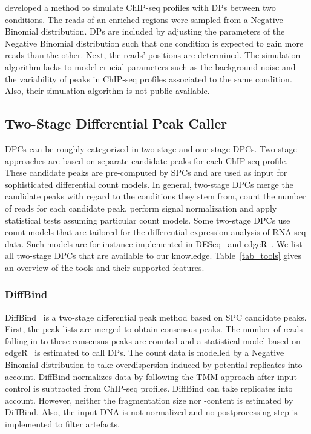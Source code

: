 \cite{Aaron2014} developed a method to simulate ChIP-seq profiles with DPs between two conditions.
The reads of an enriched regions were sampled from a Negative Binomial distribution.
DPs are included by adjusting the parameters of the Negative Binomial distribution such that one condition is expected to gain more reads than the other.
Next, the reads' positions are determined.
The simulation algorithm lacks to model crucial parameters such as the background noise and the variability of peaks in ChIP-seq profiles associated to the same condition.
Also, their simulation algorithm is not public available. 

\subsection{Two-Stage Differential Peak Caller}
\label{sec_previous_twostage_dpcs}
DPCs can be roughly categorized in two-stage and one-stage DPCs. 
Two-stage approaches are based on separate candidate peaks for each ChIP-seq profile.
These candidate peaks are pre-computed by SPCs and are used as input for sophisticated differential count models.
In general, two-stage DPCs merge the candidate peaks with regard to the conditions they stem from, count the number of reads for each candidate peak, perform signal normalization and apply statistical tests assuming particular count models.
Some two-stage DPCs use count models that are tailored for the differential expression analysis of RNA-seq data.
Such models are for instance implemented in DESeq~\citep{anders2010} and edgeR~\citep{robinson2010}.
We list all two-stage DPCs that are available to our knowledge.
Table~\ref{tab_tools} gives an overview of the tools and their supported features.

\subsubsection{DiffBind}
DiffBind~\citep{Start2013} is a two-stage differential peak method based on SPC candidate peaks.
First, the peak lists are merged to obtain consensus peaks.
The number of reads falling in to these consensus peaks are counted and a statistical model based on edgeR~\citep{robinson2010} is estimated to call DPs.
The count data is modelled by a Negative Binomial distribution to take overdispersion induced by potential replicates into account.
DiffBind normalizes data by following the TMM approach after input-control is subtracted from ChIP-seq profiles.
DiffBind can take replicates into account.
However, neither the fragmentation size nor -content is estimated by DiffBind.
Also, the input-DNA is not normalized and no postprocessing step is implemented to filter artefacts.

